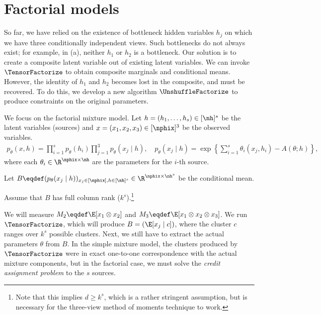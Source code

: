 \section{Factorial models} \label{sec:factorialModels}

So far, we have relied on the existence of bottleneck hidden variables $h_j$ on which
we have three conditionally independent views.  Such bottlenecks do not always
exist; for example, in (a), neither $h_1$ or $h_2$ is a bottleneck.
Our solution is to create a composite latent variable out of existing latent
variables.  We can invoke $\TensorFactorize$ to obtain composite marginals and
conditional means.  However, the identity of $h_1$ and $h_2$ becomes lost in the composite,
and must be recovered.  To do this, we develop a new algorithm $\UnshuffleFactorize$
to produce constraints on the original parameters.



We focus on the factorial mixture model.
Let $h = (h_1, \dots, h_s) \in [\nh]^s$ be the latent variables (sources)
and $x = (x_1, x_2, x_3) \in [\nphix]^3$ be the observed variables.
\begin{align}
p_\theta(x, h) = \prod_{i=1}^s p_\theta(h_i) \prod_{j=1}^3 p_\theta(x_j \mid h), \quad
p_\theta(x_j \mid h) = \exp\left\{ \sum_{i=1}^s \theta_i(x_j, h_i) - A(\theta; h) \right\},
\end{align}
where each $\theta_i \in \R^{\nphix \times \nh}$ are the parameters for the $i$-th source.

Let $B \eqdef (p_\theta(x_j \mid h))_{x_j \in [\nphix],h \in [\nh]^s} \in
\R^{\nphix \times \nh^s}$ be the conditional mean.

\begin{assumption}
  Assume that $B$ has full column rank ($k^s$).\footnote{Note that this implies
  $d \ge k^s$, which is a rather stringent assumption, but is necessary for the
  three-view method of moments technique to work.}
\end{assumption}

We will measure $M_2 \eqdef \E[x_1 \otimes x_2]$ and
$M_3 \eqdef \E[x_1 \otimes x_2 \otimes x_3]$.
We run $\TensorFactorize$, which will produce $B = (\E[x_j \mid c])$, where the
cluster $c$ ranges over $k^s$ possible clusters.  Next, we still have to
extract the actual parameters $\theta$ from $B$.  In the simple mixture model,
the clusters produced by $\TensorFactorize$ were in exact one-to-one correspondence
with the actual mixture components, but in the factorial case, we must solve
the \emph{credit assignment problem} to the $s$ sources.


